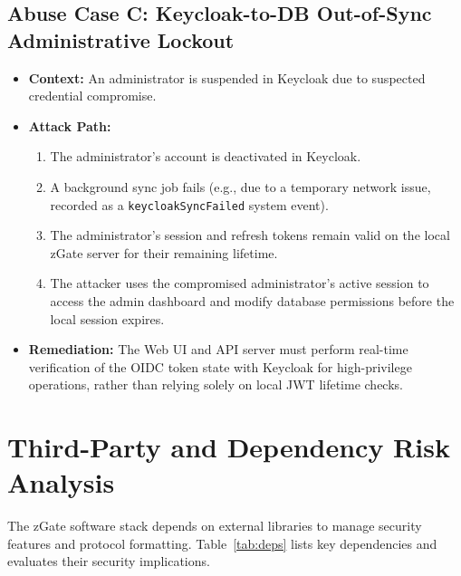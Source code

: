 \subsection{Abuse Case C: Keycloak-to-DB Out-of-Sync Administrative Lockout}
\begin{itemize}[leftmargin=*]
    \item \textbf{Context:} An administrator is suspended in Keycloak due to suspected credential compromise.
    \item \textbf{Attack Path:}
    \begin{enumerate}
        \item The administrator's account is deactivated in Keycloak.
        \item A background sync job fails (e.g., due to a temporary network issue, recorded as a \texttt{keycloakSyncFailed} system event).
        \item The administrator's session and refresh tokens remain valid on the local zGate server for their remaining lifetime.
        \item The attacker uses the compromised administrator's active session to access the admin dashboard and modify database permissions before the local session expires.
    \end{enumerate}
    \item \textbf{Remediation:} The Web UI and API server must perform real-time verification of the OIDC token state with Keycloak for high-privilege operations, rather than relying solely on local JWT lifetime checks.
\end{itemize}

\section{Third-Party and Dependency Risk Analysis}

The zGate software stack depends on external libraries to manage security features and protocol formatting. Table~\ref{tab:deps} lists key dependencies and evaluates their security implications.

